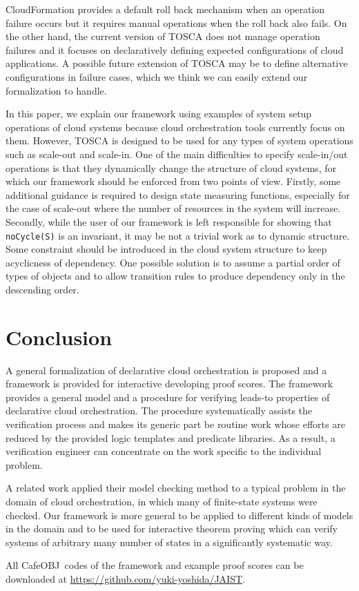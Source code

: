 \documentclass[12pt]{report}
\newcommand{\stt}[1]{{\small{\tt {#1}}}}
\newcommand{\cafeobj}{{\sf CafeOBJ}~}
\begin{document}
CloudFormation provides a default roll back mechanism when an
operation failure occurs but it requires manual operations when the
roll back also fails. On the other hand, the current version of TOSCA
does not manage operation failures and it focuses on declaratively
defining expected configurations of cloud applications. A possible
future extension of TOSCA may be to define alternative configurations
in failure cases, which we think we can easily extend our
formalization to handle.

In this paper, we explain our framework using examples of system setup
operations of cloud systems because cloud orchestration tools
currently focus on them. However, TOSCA is designed to be used for any
types of system operations such as scale-out and scale-in. One of the
main difficulties to specify scale-in/out operations is that they
dynamically change the structure of cloud systems, for which our
framework should be enforced from two points of view. Firstly, some
additional guidance is required to design state measuring functions,
especially for the case of scale-out where the number of resources in
the system will increase. Secondly, while the user of our framework is
left responsible for showing that \stt{noCycle(S)} is an invariant, it
may be not a trivial work as to dynamic structure. Some constraint
should be introduced in the cloud system structure to keep acyclicness
of dependency. One possible solution is to assume a partial order of
types of objects and to allow transition rules to produce dependency only
in the descending order.

\section{Conclusion}
A general formalization of declarative cloud orchestration is proposed
and a framework is provided for interactive developing proof
scores. The framework provides a general model and a procedure for
verifying leads-to properties of declarative cloud orchestration.  The
procedure systematically assists the verification process and makes
its generic part be routine work whose efforts are reduced by the
provided logic templates and predicate libraries. As a result, a
verification engineer can concentrate on the work specific to the
individual problem.

A related work applied their model checking method to a typical
problem in the domain of cloud orchestration, in which many of
finite-state systems were checked. Our framework is more general to be
applied to different kinds of models in the domain and to be used for
interactive theorem proving which can verify systems of arbitrary many
number of states in a significantly systematic way.

All \cafeobj codes of the framework and example proof scores
can be downloaded at \url{https://github.com/yuki-yoshida/JAIST}.

\appendix



\end{document}
